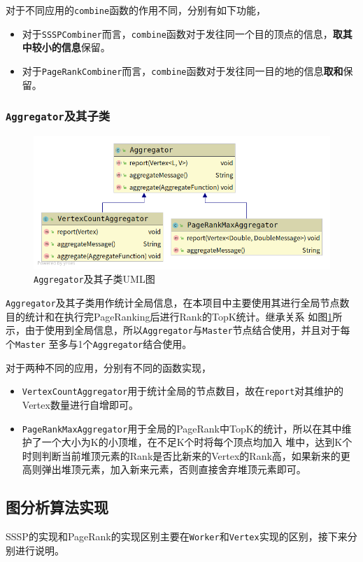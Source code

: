 \documentclass{ML}
\begin{document}
对于不同应用的\texttt{combine}函数的作用不同，分别有如下功能，
\begin{itemize}
    \item 对于\texttt{SSSPCombiner}而言，\texttt{combine}函数对于发往同一个目的顶点的信息，\textbf{取其中较小的信息}保留。
    \item 对于\texttt{PageRankCombiner}而言，\texttt{combine}函数对于发往同一目的地的信息\textbf{取和}保留。
\end{itemize}

\subsubsection{\texttt{Aggregator}及其子类}
\begin{figure}[htb]
    \centering
    \includegraphics[width=0.7\linewidth]{media/aggregator.png}
    \caption{\texttt{Aggregator}及其子类UML图}\label{fig:aggregator}
\end{figure}
\texttt{Aggregator}及其子类用作统计全局信息，在本项目中主要使用其进行全局节点数目的统计和在执行完PageRanking后进行Rank的TopK统计。继承关系
如图\ref{fig:aggregator}所示，由于使用到全局信息，所以\texttt{Aggregator}与\texttt{Master}节点结合使用，并且对于每个\texttt{Master}
至多与1个\texttt{Aggregator}结合使用。

对于两种不同的应用，分别有不同的函数实现，
\begin{itemize}
    \item \texttt{VertexCountAggregator}用于统计全局的节点数目，故在\texttt{report}对其维护的Vertex数量进行自增即可。
    \item \texttt{PageRankMaxAggregator}用于全局的PageRank中TopK的统计，所以在其中维护了一个大小为K的小顶堆，在不足K个时将每个顶点均加入
    堆中，达到K个时则判断当前堆顶元素的Rank是否比新来的Vertex的Rank高，如果新来的更高则弹出堆顶元素，加入新来元素，否则直接舍弃堆顶元素即可。
\end{itemize}

\subsection{图分析算法实现}
SSSP的实现和PageRank的实现区别主要在\texttt{Worker}和\texttt{Vertex}实现的区别，接下来分别进行说明。
\end{document}

